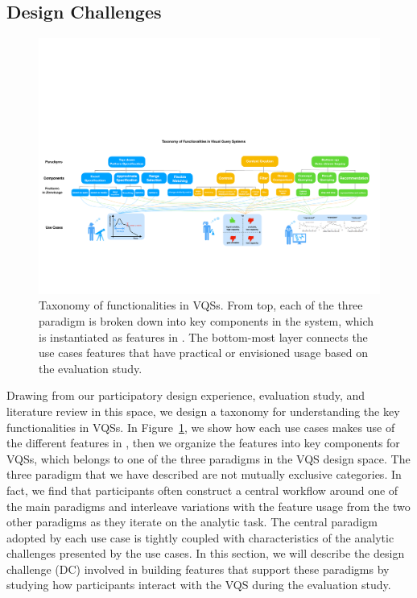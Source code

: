 \subsection{Design Challenges}
\begin{figure}[ht!]
  \centering
  \includegraphics[width=\linewidth]{figures/full_taxonomy.pdf}
  \caption{Taxonomy of functionalities in VQSs. From top, each of the three paradigm is broken down into key components in the system, which is instantiated as features in \zv. The bottom-most layer connects the use cases features that have practical or envisioned usage based on the evaluation study.}
  \label{fig:taxonomy}
\end{figure}
\par Drawing from our participatory design experience, evaluation study, and literature review in this space, we design a taxonomy for understanding the key functionalities in VQSs. In Figure~\ref{fig:taxonomy}, we show how each use cases makes use of the different features in \zv, then we organize the features into key components for VQSs, which belongs to one of the three paradigms in the VQS design space. The three paradigm that we have described are not mutually exclusive categories. In fact, we find that participants often construct a central workflow around one of the main paradigms and interleave variations with the feature usage from the two other paradigms as they iterate on the analytic task. The central paradigm adopted by each use case is tightly coupled with characteristics of the analytic challenges presented by the use cases. In this section, we will describe the design challenge (DC) involved in building features that support these paradigms by studying how participants interact with the VQS during the evaluation study.

